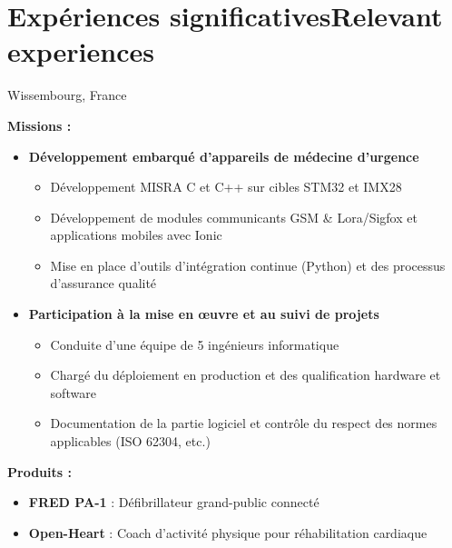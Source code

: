 \section{\ifnativelang Exp\'eriences significatives\else Relevant experiences\fi}

{}{}{Wissembourg, France}{
\ifnativelang
	\textcolor{color1}{\textbf{Missions :}}
	\begin{itemize}[leftmargin=\ListItemsMargins]
		\item \textbf{Développement embarqué d'appareils de médecine d’urgence}
		\begin{itemize}
			\item D\'eveloppement MISRA C et C++ sur cibles STM32 et IMX28
			\item D\'eveloppement de modules communicants GSM \& Lora/Sigfox et applications mobiles avec Ionic
			\item Mise en place d'outils d'intégration continue (Python) et des processus d'assurance qualit\'e
		\end{itemize}
		\item \textbf{Participation \`a la mise en \oe uvre et au suivi de projets}
		\begin{itemize}
			\ifaddmngt \item Conduite d’une équipe de 5 ingénieurs informatique  \fi
			\item Chargé du déploiement en production et des qualification hardware et software
			\item Documentation de la partie logiciel et contrôle du respect des normes applicables (ISO 62304, etc.)
		\end{itemize}
	\end{itemize}
	\vspace{\ItemsMinSpacing}
	\textcolor{color1}{\textbf{Produits :}}
	\begin{itemize}[leftmargin=\ListItemsMargins]
		\item \textbf{FRED PA-1} : Défibrillateur grand-public connecté \textcolor{color1}{\href{http://www.schiller.ch/fr/fr/product/fred-pa-1}{\ExternalLink}}
		\item \textbf{Open-Heart} : Coach d'activit\'e physique pour r\'ehabilitation cardiaque \textcolor{color1}{\href{http://www.schiller.ch/fr/fr/schiller-\%C3\%A0-la-fine-pointe-de-la-sant\%C3\%A9-connect\%C3\%A9e}{\ExternalLink}}

\end{itemize}}
